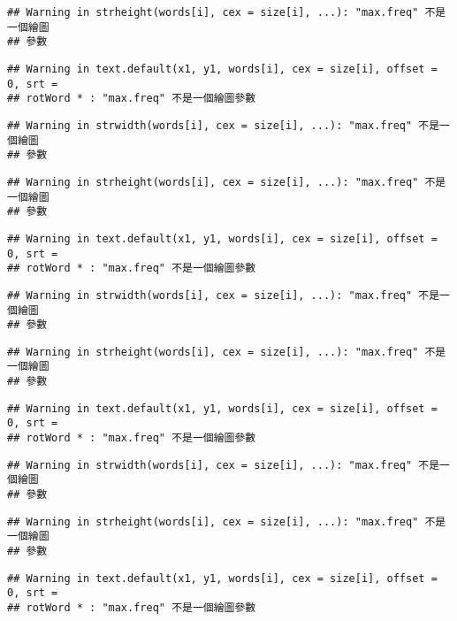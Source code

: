 \documentclass[]{article}
\begin{document}
\begin{verbatim}
## Warning in strheight(words[i], cex = size[i], ...): "max.freq" 不是一個繪圖
## 參數
\end{verbatim}

\begin{verbatim}
## Warning in text.default(x1, y1, words[i], cex = size[i], offset = 0, srt =
## rotWord * : "max.freq" 不是一個繪圖參數
\end{verbatim}

\begin{verbatim}
## Warning in strwidth(words[i], cex = size[i], ...): "max.freq" 不是一個繪圖
## 參數
\end{verbatim}

\begin{verbatim}
## Warning in strheight(words[i], cex = size[i], ...): "max.freq" 不是一個繪圖
## 參數
\end{verbatim}

\begin{verbatim}
## Warning in text.default(x1, y1, words[i], cex = size[i], offset = 0, srt =
## rotWord * : "max.freq" 不是一個繪圖參數
\end{verbatim}

\begin{verbatim}
## Warning in strwidth(words[i], cex = size[i], ...): "max.freq" 不是一個繪圖
## 參數
\end{verbatim}

\begin{verbatim}
## Warning in strheight(words[i], cex = size[i], ...): "max.freq" 不是一個繪圖
## 參數
\end{verbatim}

\begin{verbatim}
## Warning in text.default(x1, y1, words[i], cex = size[i], offset = 0, srt =
## rotWord * : "max.freq" 不是一個繪圖參數
\end{verbatim}

\begin{verbatim}
## Warning in strwidth(words[i], cex = size[i], ...): "max.freq" 不是一個繪圖
## 參數
\end{verbatim}

\begin{verbatim}
## Warning in strheight(words[i], cex = size[i], ...): "max.freq" 不是一個繪圖
## 參數
\end{verbatim}

\begin{verbatim}
## Warning in text.default(x1, y1, words[i], cex = size[i], offset = 0, srt =
## rotWord * : "max.freq" 不是一個繪圖參數
\end{verbatim}
\end{document}
